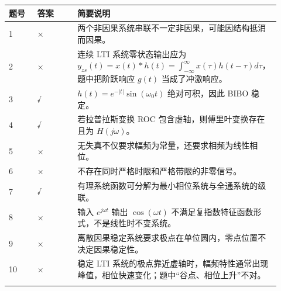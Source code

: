 \documentclass[11pt]{ctexart}
\begin{document}
\begin{center}

\footnotesize

\begin{longtable}{p{0.10\linewidth} p{0.14\linewidth} p{0.68\linewidth}}

\toprule

题号 & 答案 & 简要说明 \\

\midrule

1 & × & 两个非因果系统串联不一定非因果，可能因结构抵消而因果。 \\

\addlinespace[1pt]

2 & × & 连续 LTI 系统零状态输出应为 \(y_{zs}(t)=x(t)*h(t)=\int_{-\infty}^{\infty}x(\tau)h(t-\tau)d\tau\)，题中把阶跃响应 \(g(t)\) 当成了冲激响应。 \\

\addlinespace[1pt]

3 & √ & \(h(t)=e^{-|t|}\sin(\omega_0t)\) 绝对可积，因此 BIBO 稳定。 \\

\addlinespace[1pt]

4 & √ & 若拉普拉斯变换 ROC 包含虚轴，则傅里叶变换存在且为 \(H(j\omega)\)。 \\

\addlinespace[1pt]

5 & × & 无失真不仅要求幅频为常量，还要求相频为线性相位。 \\

\addlinespace[1pt]

6 & × & 不存在同时严格时限和严格带限的非零信号。 \\

\addlinespace[1pt]

7 & √ & 有理系统函数可分解为最小相位系统与全通系统的级联。 \\

\addlinespace[1pt]

8 & × & 输入 \(e^{j\omega t}\) 输出 \(\cos(\omega t)\) 不满足复指数特征函数形式，不是线性时不变系统。 \\

\addlinespace[1pt]

9 & × & 离散因果稳定系统要求极点在单位圆内，零点位置不决定因果稳定性。 \\

\addlinespace[1pt]

10 & × & 稳定 LTI 系统的极点靠近虚轴时，幅频特性通常出现峰值，相位快速变化；题中“谷点、相位上升”不对。 \\

\addlinespace[1pt]

\bottomrule

\end{longtable}

\normalsize

\end{center}
\end{document}
